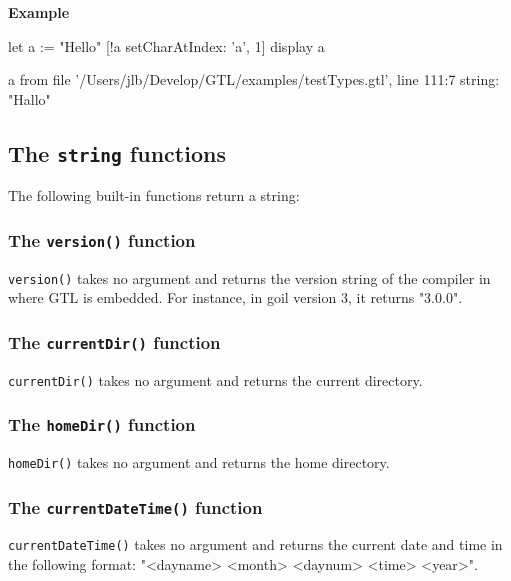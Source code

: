 \documentclass[10pt,openright,twosides,final]{memoir}
\newcommand{\scst}[1]{{\footnotesize\ttfamily\colorbox{light-blue}{"#1"}}}
\newcommand{\gtlinline}[1]{\colorbox{light-blue}{\lstinline[language=gtl]{#1}}}
\newcommand{\example}{\vspace{.75em}\noindent\textbf{Example}\vspace{0em}}
\begin{document}
\example
\begin{gtl}
let a := "Hello"
[!a setCharAtIndex: 'a', 1]
display a
\end{gtl}
\begin{console}
a from file '/Users/jlb/Develop/GTL/examples/testTypes.gtl', line 111:7
    string: "Hallo"
\end{console}

\subsection{The \texttt{string} functions}

The following built-in functions return a string:

\subsubsection{The \texttt{version()} function}

\gtlinline{version()} takes no argument and returns the version string of the compiler in where GTL is embedded. For instance, in goil version 3, it returns \scst{3.0.0}.

\subsubsection{The \texttt{currentDir()} function}

\gtlinline{currentDir()} takes no argument and returns the current directory.

\subsubsection{The \texttt{homeDir()} function}

\gtlinline{homeDir()} takes no argument and returns the home directory.

\subsubsection{The \texttt{currentDateTime()} function}

\gtlinline{currentDateTime()} takes no argument and returns the current date and time in the following format: \scst{<dayname> <month> <daynum> <time> <year>}.
\end{document}
